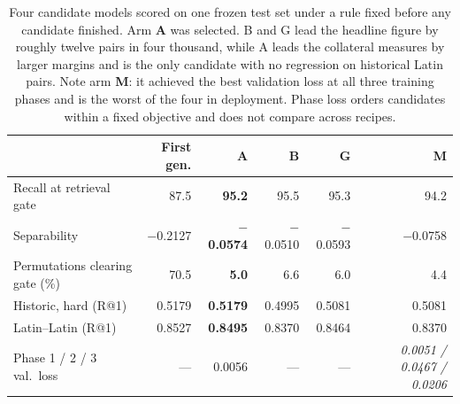 \documentclass[11pt,a4paper]{article}
\begin{document}
\clearpage

\begin{table}[p]
\centering
\small
\begin{tabular}{lrrrrr}
\toprule
 & \textbf{First gen.} & \textbf{A} & \textbf{B} & \textbf{G} & \textbf{M} \\
\midrule
Recall at retrieval gate & 87.5 & \textbf{95.2} & 95.5 & 95.3 & 94.2 \\
Separability             & $-$0.2127 & \textbf{$-$0.0574} & $-$0.0510 & $-$0.0593 & $-$0.0758 \\
Permutations clearing gate (\%) & 70.5 & \textbf{5.0} & 6.6 & 6.0 & 4.4 \\
Historic, hard (R@1)     & 0.5179 & \textbf{0.5179} & 0.4995 & 0.5081 & 0.5081 \\
Latin--Latin (R@1)       & 0.8527 & \textbf{0.8495} & 0.8370 & 0.8464 & 0.8370 \\
\midrule
Phase 1 / 2 / 3 val.\ loss & --- & 0.0056 & --- & --- & \emph{0.0051 / 0.0467 / 0.0206} \\
\bottomrule
\end{tabular}
\caption{Four candidate models scored on one frozen test set under a rule fixed before any candidate finished. Arm \textbf{A} was selected. B and G lead the headline figure by roughly twelve pairs in four thousand, while A leads the collateral measures by larger margins and is the only candidate with no regression on historical Latin pairs. Note arm \textbf{M}: it achieved the best validation loss at all three training phases and is the worst of the four in deployment. Phase loss orders candidates within a fixed objective and does not compare across recipes.}
\label{tab:arms}
\end{table}
\end{document}
